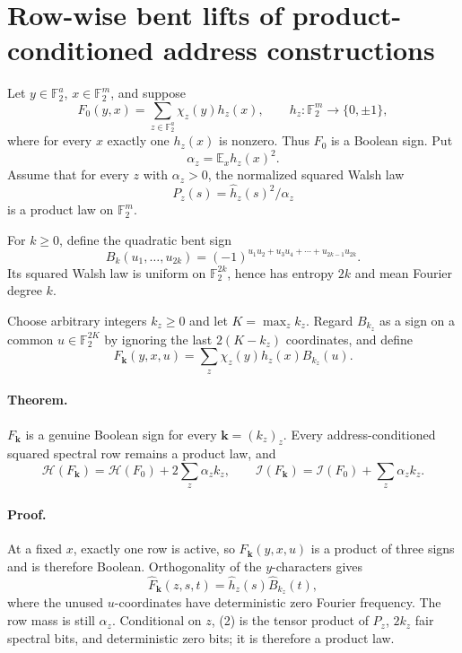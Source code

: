 \section*{Row-wise bent lifts of product-conditioned address constructions}

Let $y\in\mathbb F_2^a$, $x\in\mathbb F_2^m$, and suppose
\[
 F_0(y,x)=\sum_{z\in\mathbb F_2^a}\chi_z(y)h_z(x),
 \qquad h_z:\mathbb F_2^m\to\{0,\pm1\},
\]
where for every $x$ exactly one $h_z(x)$ is nonzero.  Thus $F_0$ is a
Boolean sign.  Put
\[
 \alpha_z=\mathbb E_xh_z(x)^2.
\]
Assume that for every $z$ with $\alpha_z>0$, the normalized squared Walsh
law
\[
 P_z(s)=\widehat h_z(s)^2/\alpha_z
\]
is a product law on $\mathbb F_2^m$.

For $k\ge0$, define the quadratic bent sign
\[
 B_k(u_1,\ldots,u_{2k})
 =(-1)^{u_1u_2+u_3u_4+\cdots+u_{2k-1}u_{2k}}.
\]
Its squared Walsh law is uniform on $\mathbb F_2^{2k}$, hence has entropy
$2k$ and mean Fourier degree $k$.

Choose arbitrary integers $k_z\ge0$ and let $K=\max_z k_z$.  Regard
$B_{k_z}$ as a sign on a common $u\in\mathbb F_2^{2K}$ by ignoring the last
$2(K-k_z)$ coordinates, and define
\[
 F_{\boldsymbol k}(y,x,u)
 =\sum_z\chi_z(y)h_z(x)B_{k_z}(u).
\]

\paragraph{Theorem.}
$F_{\boldsymbol k}$ is a genuine Boolean sign for every
$\boldsymbol k=(k_z)_z$.  Every address-conditioned squared spectral row
remains a product law, and
\[
 \mathcal H(F_{\boldsymbol k})
 =\mathcal H(F_0)+2\sum_z\alpha_zk_z,
 \qquad
 \mathcal I(F_{\boldsymbol k})
 =\mathcal I(F_0)+\sum_z\alpha_zk_z.                 \tag{1}
\]

\paragraph{Proof.}
At a fixed $x$, exactly one row is active, so
$F_{\boldsymbol k}(y,x,u)$ is a product of three signs and is therefore
Boolean.  Orthogonality of the $y$-characters gives
\[
 \widehat F_{\boldsymbol k}(z,s,t)
 =\widehat h_z(s)\widehat B_{k_z}(t),                \tag{2}
\]
where the unused $u$-coordinates have deterministic zero Fourier frequency.
The row mass is still $\alpha_z$.  Conditional on $z$, (2) is the tensor
product of $P_z$, $2k_z$ fair spectral bits, and deterministic zero bits;
it is therefore a product law.

